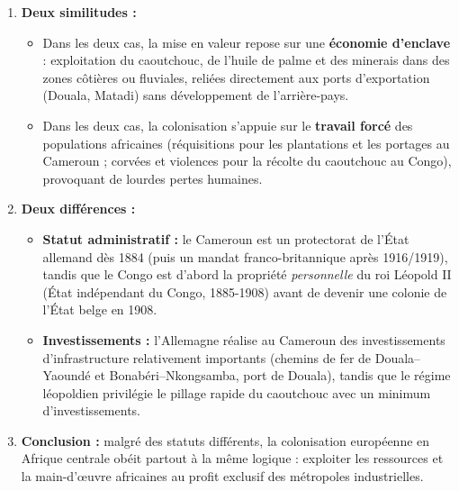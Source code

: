 \documentclass[11pt]{article}
\begin{document}
\begin{corrige}
\begin{enumerate}
\item \textbf{Deux similitudes :}
\begin{itemize}
\item Dans les deux cas, la mise en valeur repose sur une \textbf{économie d'enclave} : exploitation du caoutchouc, de l'huile de palme et des minerais dans des zones côtières ou fluviales, reliées directement aux ports d'exportation (Douala, Matadi) sans développement de l'arrière-pays.
\item Dans les deux cas, la colonisation s'appuie sur le \textbf{travail forcé} des populations africaines (réquisitions pour les plantations et les portages au Cameroun ; corvées et violences pour la récolte du caoutchouc au Congo), provoquant de lourdes pertes humaines.
\end{itemize}
\item \textbf{Deux différences :}
\begin{itemize}
\item \textbf{Statut administratif :} le Cameroun est un protectorat de l'État allemand dès 1884 (puis un mandat franco-britannique après 1916/1919), tandis que le Congo est d'abord la propriété \emph{personnelle} du roi Léopold II (État indépendant du Congo, 1885-1908) avant de devenir une colonie de l'État belge en 1908.
\item \textbf{Investissements :} l'Allemagne réalise au Cameroun des investissements d'infrastructure relativement importants (chemins de fer de Douala--Yaoundé et Bonabéri--Nkongsamba, port de Douala), tandis que le régime léopoldien privilégie le pillage rapide du caoutchouc avec un minimum d'investissements.
\end{itemize}
\item \textbf{Conclusion :} malgré des statuts différents, la colonisation européenne en Afrique centrale obéit partout à la même logique : exploiter les ressources et la main-d'œuvre africaines au profit exclusif des métropoles industrielles.
\end{enumerate}
\end{corrige}
\end{document}
